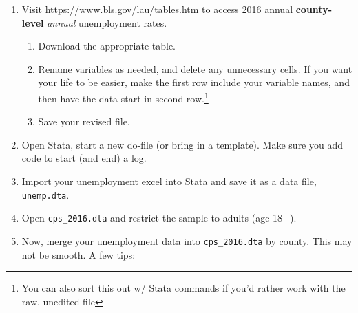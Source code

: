 \documentclass[
]{article}
\begin{document}
\begin{enumerate}
\def\labelenumi{\arabic{enumi}.}
\item
  Visit \url{https://www.bls.gov/lau/tables.htm} to access 2016 annual
  \textbf{county-level} \emph{annual} unemployment rates.

  \begin{enumerate}
  \def\labelenumii{\arabic{enumii}.}
  \item
    Download the appropriate table.
  \item
    Rename variables as needed, and delete any unnecessary cells. If you
    want your life to be easier, make the first row include your
    variable names, and then have the data start in second
    row.\footnote{You can also sort this out w/ Stata commands if you'd
      rather work with the raw, unedited file}
  \item
    Save your revised file.
  \end{enumerate}
\item
  Open Stata, start a new do-file (or bring in a template). Make sure
  you add code to start (and end) a log.
\item
  Import your unemployment excel into Stata and save it as a data file,
  \texttt{unemp.dta}.
\item
  Open \texttt{cps\_2016.dta} and restrict the sample to adults (age
  18+).
\item
  Now, merge your unemployment data into \texttt{cps\_2016.dta} by
  county. This may not be smooth. A few tips:


\end{enumerate}
\end{document}
